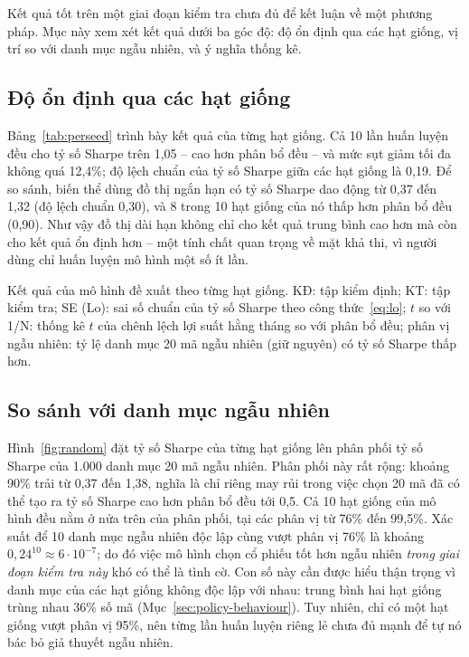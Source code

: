 Kết quả tốt trên một giai đoạn kiểm tra chưa đủ để kết luận về một phương pháp. Mục này xem xét kết quả dưới ba góc độ: độ ổn định qua các hạt giống, vị trí so với danh mục ngẫu nhiên, và ý nghĩa thống kê.

\subsection{Độ ổn định qua các hạt giống}

Bảng~\ref{tab:perseed} trình bày kết quả của từng hạt giống. Cả 10 lần huấn luyện đều cho tỷ số Sharpe trên 1,05 -- cao hơn phân bổ đều -- và mức sụt giảm tối đa không quá 12,4\%; độ lệch chuẩn của tỷ số Sharpe giữa các hạt giống là 0,19. Để so sánh, biến thể dùng đồ thị ngắn hạn có tỷ số Sharpe dao động từ 0,37 đến 1,32 (độ lệch chuẩn 0,30), và 8 trong 10 hạt giống của nó thấp hơn phân bổ đều (0,90). Như vậy đồ thị dài hạn không chỉ cho kết quả trung bình cao hơn mà còn cho kết quả ổn định hơn -- một tính chất quan trọng về mặt khả thi, vì người dùng chỉ huấn luyện mô hình một số ít lần.

\begin{table}[ht]
\centering\footnotesize
\setlength{\tabcolsep}{4pt}
\caption{Kết quả của mô hình đề xuất theo từng hạt giống. KĐ: tập kiểm định; KT: tập kiểm tra; SE (Lo): sai số chuẩn của tỷ số Sharpe theo công thức~\eqref{eq:lo}; $t$ so với 1/N: thống kê $t$ của chênh lệch lợi suất hằng tháng so với phân bổ đều; phân vị ngẫu nhiên: tỷ lệ danh mục 20 mã ngẫu nhiên (giữ nguyên) có tỷ số Sharpe thấp hơn.}
\label{tab:perseed}
\begin{adjustbox}{max width=\textwidth}\end{adjustbox}
\end{table}

\subsection{So sánh với danh mục ngẫu nhiên}

Hình~\ref{fig:random} đặt tỷ số Sharpe của từng hạt giống lên phân phối tỷ số Sharpe của 1.000 danh mục 20 mã ngẫu nhiên. Phân phối này rất rộng: khoảng 90\% trải từ 0,37 đến 1,38, nghĩa là chỉ riêng may rủi trong việc chọn 20 mã đã có thể tạo ra tỷ số Sharpe cao hơn phân bổ đều tới 0,5. Cả 10 hạt giống của mô hình đều nằm ở nửa trên của phân phối, tại các phân vị từ 76\% đến 99,5\%. Xác suất để 10 danh mục ngẫu nhiên độc lập cùng vượt phân vị 76\% là khoảng $0{,}24^{10}\approx 6\cdot10^{-7}$; do đó việc mô hình chọn cổ phiếu tốt hơn ngẫu nhiên \emph{trong giai đoạn kiểm tra này} khó có thể là tình cờ. Con số này cần được hiểu thận trọng vì danh mục của các hạt giống không độc lập với nhau: trung bình hai hạt giống trùng nhau 36\% số mã (Mục~\ref{sec:policy-behaviour}). Tuy nhiên, chỉ có một hạt giống vượt phân vị 95\%, nên từng lần huấn luyện riêng lẻ chưa đủ mạnh để tự nó bác bỏ giả thuyết ngẫu nhiên.

